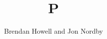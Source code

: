 

\title{P}
\author{Brendan Howell and Jon Nordby}

\maketitle
\def \Kern {\dialog{Kern}}
\def \Raster {\dialog{Raster}}
\def \Liza {\dialog{Liza}}
\def \Doolittle {\dialog{Doolittle}}
\def \msKern {\dialog{Mrs. Kern}}
\def \Hilde {\dialog{Hilde}}









\theend

\bye
